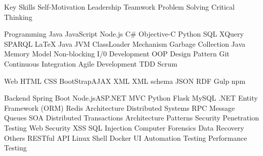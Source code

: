 

\begin{cvskills}

  \cvskill
    {Key Skills} %
    {Self-Motivation \quad Leadership \quad Teamwork \quad Problem Solving \quad Critical Thinking} %
    
  \cvskill
    {Programming} %
    {Java \quad JavaScript \quad Node.js \quad C\# \quad Objective-C   \quad Python \quad SQL \quad XQuery  \quad SPARQL \quad LaTeX} %
      \cvskill
    {Java} %
    {JVM \quad ClassLoader Mechanism \quad Garbage Collection \quad Java Memory Model  \quad Non-blocking I/0} %
  \cvskill
    {Development} %
    {OOP \quad Design Pattern \quad Git \quad Continuous Integration \quad Agile Development \quad TDD \quad Scrum} %

  \cvskill
    {Web} %
    {HTML \quad CSS \quad BootStrap\quad AJAX \quad XML \quad XML schema \quad JSON \quad   RDF  \quad Gulp \quad npm} %

   \cvskill
    {Backend} %
    {Spring Boot \quad Node.js\quad ASP.NET MVC \quad Python Flask  \quad MySQL \quad  .NET Entity Framework (ORM) \quad  Redis} %
 \cvskill
    {Architecture} %
    {Distributed Systems \quad RPC \quad Message Queues \quad SOA \quad Distributed Transactions  \quad Architecture Patterns   } %
 \cvskill
{Security} %
{Penetration Testing \quad Web Security \quad XSS \quad SQL Injection \quad Computer Forensics \quad Data Recovery   } %
 \cvskill
    {Others} %
    {RESTful API \quad Linux \quad Shell \quad Docker \quad UI Automation Testing \quad Performance Testing  } %
\end{cvskills}